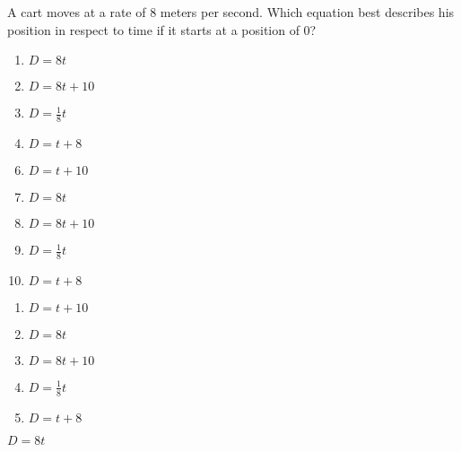 A cart moves at a rate of 8 meters per second. Which equation best describes his position in respect to time if it starts at a position of 0?

\ifsat
	\begin{enumerate}[label=\Alph*)]
		\item  $\textit{D}=8\textit{t}$ %
		\item  $\textit{D}=8\textit{t}+10$ 
		\item  $\textit{D}=\frac{1}{8}\textit{t}$ 
		\item  $\textit{D}=\textit{t}+8$ 
	\end{enumerate}
\else
\fi

\ifacteven
	\begin{enumerate}[label=\textbf{\Alph*.},itemsep=\fill,align=left]
		\setcounter{enumii}{5}
		\item   $\textit{D}=\textit{t}+10$
		\item  $\textit{D}=8\textit{t}$ %
		\item  $\textit{D}=8\textit{t}+10$ 
		\addtocounter{enumii}{1}
		\item  $\textit{D}=\frac{1}{8}\textit{t}$ 
		\item  $\textit{D}=\textit{t}+8$ 
	\end{enumerate}
\else
\fi

\ifactodd
	\begin{enumerate}[label=\textbf{\Alph*.},itemsep=\fill,align=left]
		\item   $\textit{D}=\textit{t}+10$
		\item  $\textit{D}=8\textit{t}$ %
		\item  $\textit{D}=8\textit{t}+10$ 
		\item  $\textit{D}=\frac{1}{8}\textit{t}$ 
		\item  $\textit{D}=\textit{t}+8$ 
	\end{enumerate}
\else
\fi

\ifgridin
  $\textit{D}=8\textit{t}$ %
		
\else
\fi


